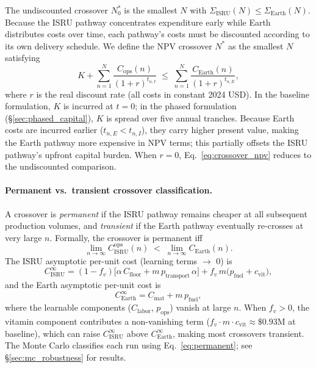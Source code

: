 \documentclass[preprint,12pt]{elsarticle}
\begin{document}
The undiscounted crossover $N^*_0$ is the smallest $N$ with $\Sigma_{\mathrm{ISRU}}(N) \leq \Sigma_{\mathrm{Earth}}(N)$. Because the ISRU pathway concentrates expenditure early while Earth distributes costs over time, each pathway's costs must be discounted according to its own delivery schedule. We define the NPV crossover $N^*$ as the smallest $N$ satisfying
\begin{equation}
  K + \sum_{n=1}^{N} \frac{C_{\mathrm{ops}}(n)}{(1+r)^{t_{n,I}}} \;\leq\; \sum_{n=1}^{N} \frac{C_{\mathrm{Earth}}(n)}{(1+r)^{t_{n,E}}},
  \label{eq:crossover_npv}
\end{equation}
where $r$ is the real discount rate (all costs in constant 2024 USD). In the baseline formulation, $K$ is incurred at $t = 0$; in the phased formulation (\S\ref{sec:phased_capital}), $K$ is spread over five annual tranches. Because Earth costs are incurred earlier ($t_{n,E} < t_{n,I}$), they carry higher present value, making the Earth pathway more expensive in NPV terms; this partially offsets the ISRU pathway's upfront capital burden. When $r = 0$, Eq.~\ref{eq:crossover_npv} reduces to the undiscounted comparison.

\paragraph{Permanent vs.\ transient crossover classification.} A crossover is \emph{permanent} if the ISRU pathway remains cheaper at all subsequent production volumes, and \emph{transient} if the Earth pathway eventually re-crosses at very large $n$. Formally, the crossover is permanent iff
\begin{equation}
  \lim_{n \to \infty} C_{\mathrm{ISRU}}^{\mathrm{ops}}(n) \;<\; \lim_{n \to \infty} C_{\mathrm{Earth}}(n).
  \label{eq:permanent}
\end{equation}
The ISRU asymptotic per-unit cost (learning terms $\to$ 0) is
\[
  C_{\mathrm{ISRU}}^{\infty} = (1 - f_v)\bigl[\alpha \, C_{\mathrm{floor}} + m \, p_{\mathrm{transport}} \, \alpha\bigr] + f_v \, m \bigl(p_{\mathrm{fuel}} + c_{\mathrm{vit}}\bigr),
\]
and the Earth asymptotic per-unit cost is
\[
  C_{\mathrm{Earth}}^{\infty} = C_{\mathrm{mat}} + m \, p_{\mathrm{fuel}},
\]
where the learnable components ($C_{\mathrm{labor}}$, $p_{\mathrm{ops}}$) vanish at large $n$. When $f_v > 0$, the vitamin component contributes a non-vanishing term ($f_v \cdot m \cdot c_{\mathrm{vit}} \approx \$0.93$M at baseline), which can raise $C_{\mathrm{ISRU}}^{\infty}$ above $C_{\mathrm{Earth}}^{\infty}$, making most crossovers transient. The Monte Carlo classifies each run using Eq.~\ref{eq:permanent}; see \S\ref{sec:mc_robustness} for results.
\end{document}

